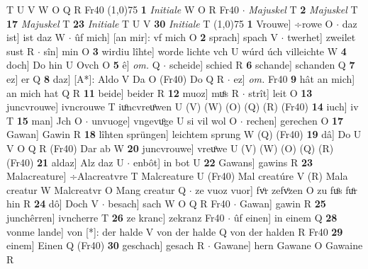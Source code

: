 \documentclass[8pt,a4paper,notitlepage]{article}
\begin{document}
\begin{table}[ht]
\begin{minipage}[t]{0.5\linewidth}
T U V W O Q R Fr40 \newline
\line(1,0){75} \newline
\textbf{1} \textit{Initiale} W O R Fr40   $\cdot$ \textit{Majuskel} T  \textbf{2} \textit{Majuskel} T  \textbf{17} \textit{Majuskel} T  \textbf{23} \textit{Initiale} T U V  \textbf{30} \textit{Initiale} T  \newline
\line(1,0){75} \newline
\textbf{1} Vrouwe] ÷rowe O  $\cdot$ daz ist] ist daz W  $\cdot$ ûf mich] [an mir]: vf mich O \textbf{2} sprach] spach V  $\cdot$ twerhet] zweilet sust R  $\cdot$ sîn] min O \textbf{3} wirdiu lîhte] worde lichte vch U wúrd úch villeichte W \textbf{4} doch] Do hin U Ovch O \textbf{5} ê] \textit{om.} Q  $\cdot$ scheide] schied R \textbf{6} schande] schanden Q \textbf{7} ez] er Q \textbf{8} daz] [A*]: Aldo V Da O (Fr40) Do Q R  $\cdot$ ez] \textit{om.} Fr40 \textbf{9} hât an mich] an mich hat Q R \textbf{11} beide] beider R \textbf{12} muoz] muͦs R  $\cdot$ strît] leit O \textbf{13} juncvrouwe] ivncrouwe T iuͦncvreuͦwen U (V) (W) (O) (Q) (R) (Fr40) \textbf{14} iuch] iv T \textbf{15} man] Jch O  $\cdot$ unvuoge] vngevuͦge U si vil wol O  $\cdot$ rechen] gerechen O \textbf{17} Gawan] Gawin R \textbf{18} lîhten sprüngen] leichtem sprung W (Q) (Fr40) \textbf{19} dâ] Do U V O Q R (Fr40) Dar ab W \textbf{20} juncvrouwe] vreuͦwe U (V) (W) (O) (Q) (R) (Fr40) \textbf{21} aldaz] Alz daz U  $\cdot$ enbôt] in bot U \textbf{22} Gawans] gawins R \textbf{23} Malacreature] ÷Alacreatvre T Malcreature U (Fr40) Mal creatúre V (R) Mala creatur W Malcreatvr O Mang creatur Q  $\cdot$ ze vuoz vuor] fvͦr zefvͦzen O zu fuͦs fuͦr hin R \textbf{24} dô] Doch V  $\cdot$ besach] sach W O Q R Fr40  $\cdot$ Gawan] gawin R \textbf{25} junchêrren] ivncherre T \textbf{26} ze kranc] zekranz Fr40  $\cdot$ ûf einen] in einem Q \textbf{28} vonme lande] von [*]: der halde V von der halde Q von der halden R Fr40 \textbf{29} einem] Einen Q (Fr40) \textbf{30} geschach] gesach R  $\cdot$ Gawane] hern Gawane O Gawaine R \newline
\end{minipage}
\end{table}
\end{document}
